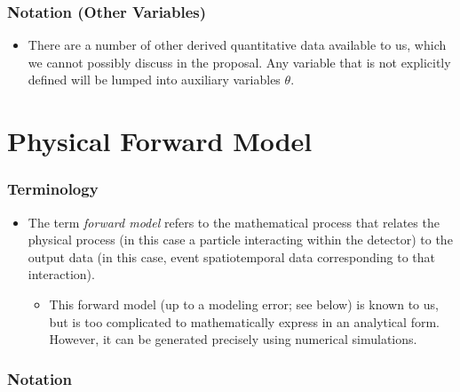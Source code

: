 \documentclass[]{article}
\providecommand{\tightlist}{%
  \setlength{\itemsep}{0pt}\setlength{\parskip}{0pt}}
\begin{document}
\subsubsection{Notation (Other Variables)}

\begin{itemize}
\tightlist
\item
  There are a number of other derived quantitative data available to us, which we cannot possibly discuss in the proposal. Any variable that is not explicitly defined will be lumped into auxiliary variables \(\theta\).
\end{itemize}


\section{Physical Forward Model}

\subsubsection{Terminology}

\begin{itemize}
\tightlist
\item
  The term \emph{forward model} refers to the mathematical process that relates the physical process (in this case a particle interacting within the detector) to the output data (in this case, event spatiotemporal data corresponding to that interaction).

  \begin{itemize}
  \tightlist
  \item
    This forward model (up to a modeling error; see below) is known to us, but is too complicated to mathematically express in an analytical form. However, it can be generated precisely using numerical simulations.
  \end{itemize}
\end{itemize}

\subsubsection{Notation}
\end{document}
